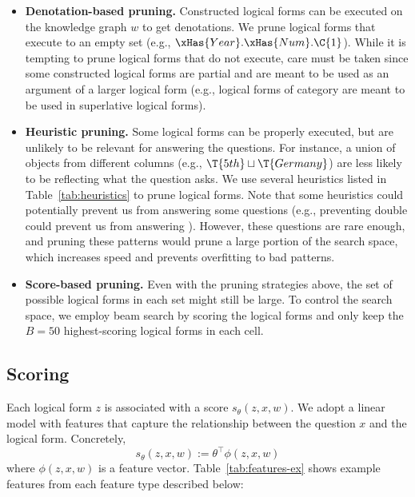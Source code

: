 \begin{itemize}
\item \textbf{Denotation-based pruning.}
Constructed logical forms can be executed
on the knowledge graph $w$ to get denotations.
We prune logical forms that execute to an empty set
(e.g., $\xHas{Year}.\xHas{Num}.\C{1}$).
While it is tempting to prune logical forms that do not execute,
care must be taken since some constructed logical forms
are partial and are meant to be used as an argument
of a larger logical form
(e.g., logical forms of category 
are meant to be used in superlative logical forms).

\item \textbf{Heuristic pruning.}
Some logical forms can be properly executed,
but are unlikely to be relevant for answering the questions.
For instance, a union of objects from different columns
(e.g., $\T{5th} \sqcup \T{Germany}$)
are less likely to be reflecting what the question asks.
We use several heuristics listed in Table~\ref{tab:heuristics}
to prune logical forms.
Note that some heuristics could potentially prevent us
from answering some questions
(e.g., preventing double 
could prevent us from answering
).
However, these questions are rare enough,
and pruning these patterns would prune a large portion of the
search space, which increases speed and prevents overfitting
to bad patterns.

\item \textbf{Score-based pruning.}
Even with the pruning strategies above,
the set of possible logical forms in each set
might still be large.
To control the search space,
we employ beam search by scoring the logical forms
and only keep the $B = 50$
highest-scoring logical forms in each cell.

\end{itemize}

\subsection{Scoring}
Each logical form $z$ is associated with a score $s_\theta(z, x, w)$.
We adopt a linear model with features that capture the relationship
between the question $x$ and the logical form.
Concretely,
\begin{equation}
s_\theta(z, x, w) := \theta^\top \phi(z, x, w)
\end{equation}
where $\phi(z, x, w)$ is a feature vector.
Table~\ref{tab:features-ex}
shows example features from each feature type
described below:


